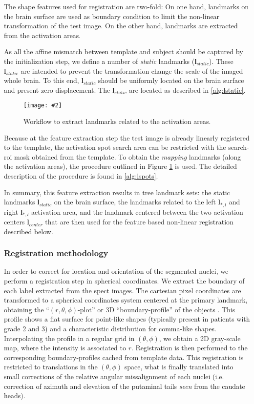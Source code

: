 \documentclass{frontiers}
\newcommand{\insertgraphic}[2]{\texttt{[image: \#2]}}
\newcommand{\insertgraphic}[2]{\texttt{[image: \#2]}}
\newcommand{\lm}[1]{\ensuremath{\mathbf{l}_{#1}}}
\begin{document}
The shape features used for registration are two-fold:
On one hand, landmarks on the brain surface are used as boundary condition to limit the non-linear 
  transformation of the test image. 
On the other hand, landmarks are extracted from the activation areas. 

As all the affine mismatch between template and subject should be captured by the initialization
  step, we define a number of \emph{static} landmarks (\lm{static}).
These \lm{static} are intended to prevent the 
  transformation change the scale of the imaged whole brain.
To this end, \lm{static} should be uniformly located on the brain surface and present
  zero displacement. The \lm{static} are located as described in \autoref{alg:lstatic}.

\begin{figure}
\centering
\insertgraphic{width=0.75\linewidth}{figures/03-Segflow}
\caption{ \label{fig:featlmextract} Workflow to extract landmarks related to the activation areas. 
}
\end{figure}

Because at the feature extraction step the test image is already linearly registered to the template, 
  the activation spot search area can be restricted with the search-\gls*{roi} mask obtained from the template.
To obtain the \emph{mapping} landmarks (along the activation areas), the procedure
  outlined in Figure \ref{fig:featlmextract} is used.
The detailed description of the procedure is found in \autoref{alg:lspots}.

In summary, this feature extraction results in tree landmark sets: the static landmarks \lm{static} on the 
  brain surface, the landmarks related to the left \lm{*,l} and right \lm{*,l} activation area, 
  and the  landmark centered between the two activation centers \lm{center} that are then used for the 
  feature based non-linear registration described below.

\subsubsection{Registration methodology}
\label{sec:registration}
In order to correct for location and orientation of the segmented nuclei, we
  perform a registration step in spherical coordinates. We extract the boundary of
  each label extracted from the \gls*{spect} images. The cartesian pixel coordinates are
  transformed to a spherical coordinates system centered at the primary 
  landmark, obtaining the ``$(r,\theta,\phi)$-plot'' or 3D ``boundary-profile''
  of the objects \citep{davies_computer_2012}.
This profile shows a flat surface for point-like shapes (typically
  present in patients with grade 2 and 3) and a characteristic distribution for
  comma-like shapes. Interpolating the profile in a regular grid in $(\theta,\phi)$, 
  we obtain a 2D gray-scale map, where the intensity is associated to $r$.
Registration is then performed to the corresponding boundary-profiles cached from
  template data. This registration is restricted to translations in the
  $(\theta,\phi)$ space, what is finally translated into small corrections of
  the relative angular missalignment of each nuclei (i.e. correction of
  azimuth and elevation of the putaminal tails \emph{seen} from the caudate heads).
\end{document}
